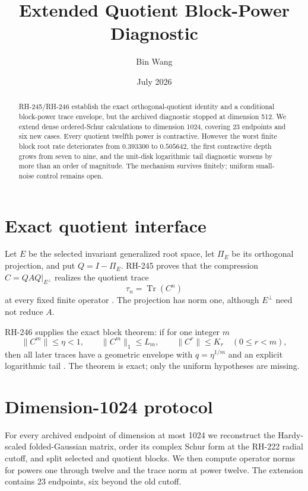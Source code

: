 \documentclass[11pt]{article}
\title{Extended Quotient Block-Power Diagnostic}
\author{Bin Wang}
\date{July 2026}
\theoremstyle{remark}
\begin{document}
\maketitle

\begin{abstract}
RH-245/RH-246 establish the exact orthogonal-quotient identity and a
conditional block-power trace envelope, but the archived diagnostic stopped at
dimension 512.  We extend dense ordered-Schur calculations to dimension 1024,
covering 23 endpoints and six new cases.  Every quotient twelfth power is
contractive.  However the worst finite block root rate deteriorates from
$0.393300$ to $0.505642$, the first contractive depth grows from seven to
nine, and the unit-disk logarithmic tail diagnostic worsens by more than an
order of magnitude.  The mechanism survives finitely; uniform small-noise
control remains open.
\end{abstract}

\section{Exact quotient interface}

Let $E$ be the selected invariant generalized root space, let $\Pi_E$ be its
orthogonal projection, and put $Q=I-\Pi_E$.  RH-245 proves that the compression
$C=QAQ|_{E^\perp}$ realizes the quotient trace
\begin{equation}
 \tau_n=\operatorname{Tr}(C^n)
 \label{eq:quotient}
\end{equation}
at every fixed finite operator \citep{WangRH245}.  The projection has norm one,
although $E^\perp$ need not reduce $A$.

RH-246 supplies the exact block theorem: if for one integer $m$
\begin{equation}
 \|C^m\|\le\eta<1,
 \qquad \|C^m\|_1\le L_m,
 \qquad \|C^r\|\le K_r\quad(0\le r<m),
 \label{eq:block}
\end{equation}
then all later traces have a geometric envelope with
$q=\eta^{1/m}$ and an explicit logarithmic tail \citep{WangRH246}.  The
theorem is exact; only the uniform hypotheses are missing.

\section{Dimension-1024 protocol}

For every archived endpoint of dimension at most 1024 we reconstruct the
Hardy-scaled folded-Gaussian matrix, order its complex Schur form at the
RH-222 radial cutoff, and split selected and quotient blocks.  We then compute
operator norms for powers one through twelve and the trace norm at power
twelve.  The extension contains 23 endpoints, six beyond the old cutoff.
\end{document}

